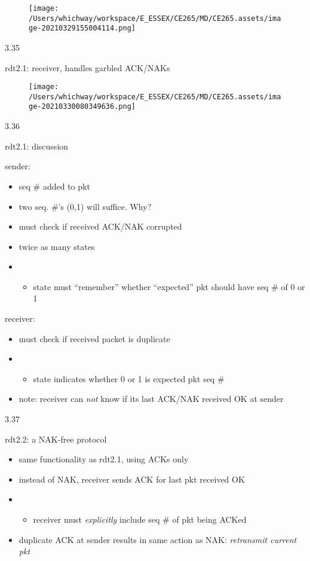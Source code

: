 \documentclass[
]{article}
\begin{document}
\begin{figure}
\centering
\texttt{[image: /Users/whichway/workspace/E\_ESSEX/CE265/MD/CE265.assets/image-20210329155004114.png]}
\caption{}
\end{figure}

3.35

rdt2.1: receiver, handles garbled ACK/NAKs

\begin{figure}
\centering
\texttt{[image: /Users/whichway/workspace/E\_ESSEX/CE265/MD/CE265.assets/image-20210330080349636.png]}
\caption{}
\end{figure}

3.36

rdt2.1: discussion

sender:

\begin{itemize}
\item
  seq \# added to pkt
\item
  two seq. \#'s (0,1) will suffice. Why?
\item
  must check if received ACK/NAK corrupted
\item
  twice as many states
\item
  \begin{itemize}
  \item
    state must ``remember'' whether ``expected'' pkt should have seq \#
    of 0 or 1
  \end{itemize}
\end{itemize}

receiver:

\begin{itemize}
\item
  must check if received packet is duplicate
\item
  \begin{itemize}
  \item
    state indicates whether 0 or 1 is expected pkt seq \#
  \end{itemize}
\item
  note: receiver can \emph{not} know if its last ACK/NAK received OK at
  sender
\end{itemize}

3.37

rdt2.2: a NAK-free protocol

\begin{itemize}
\item
  same functionality as rdt2.1, using ACKs only
\item
  instead of NAK, receiver sends ACK for last pkt received OK
\item
  \begin{itemize}
  \item
    receiver must \emph{explicitly} include seq \# of pkt being ACKed
  \end{itemize}
\item
  duplicate ACK at sender results in same action as NAK:
  \emph{retransmit current pkt}
\end{itemize}
\end{document}
